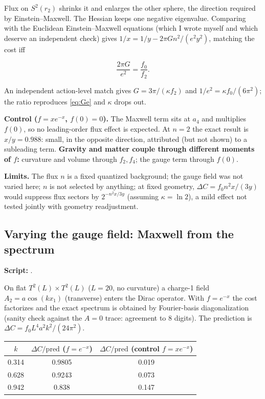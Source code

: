 \documentclass[11pt]{article}
\newcommand{\repo}{https://github.com/juhameskanen/abstract/blob/main/tests}
\newcommand{\testfile}[1]{\href{\repo/#1}{\texttt{\detokenize{#1}}}}
\begin{document}
Flux on $S^2(r_2)$ shrinks it and enlarges the other sphere, the direction required by Einstein--Maxwell.
The Hessian keeps one negative eigenvalue. Comparing with the Euclidean Einstein--Maxwell equations
(which I wrote myself and which deserve an independent check) gives
$1/x=1/y-2\pi G n^2/(e^2y^2)$, matching the cost iff

\begin{equation}
\frac{2\pi G}{e^2}=\frac{f_0}{f_2}.
\label{eq:Ge}
\end{equation}

An independent action-level match gives $G=3\pi/(\kappa f_2)$ and $1/e^2=\kappa f_0/(6\pi^2)$; the ratio
reproduces \eqref{eq:Ge} and $\kappa$ drops out.

\textbf{Control ($f=xe^{-x}$, $f(0)=0$).} The Maxwell term sits at $a_4$ and multiplies $f(0)$, so no leading-order
flux effect is expected. At $n=2$ the exact result is $x/y=0.988$: small, in the opposite direction, attributed (but not shown) to a
subleading term. \textbf{Gravity and matter couple through different moments of $f$:} curvature and volume through
$f_2,f_4$; the gauge term through $f(0)$.

\textbf{Limits.} The flux $n$ is a fixed quantized background; the gauge field was not varied here;
$n$ is not selected by anything; at fixed geometry, $\Delta C=f_0n^2x/(3y)$ would suppress flux
sectors by $2^{-n^2x/3y}$ (assuming $\kappa=\ln2$), a mild effect not tested jointly with geometry readjustment.


\subsection{Varying the gauge field: Maxwell from the spectrum}
\label{sec:maxwell}
\textbf{Script:} \testfile{maxwell_from_spectrum.py}.

On flat $T^2(L)\times T^2(L)$ ($L=20$, no curvature) a charge-1 field $A_2=a\cos(kx_1)$ (transverse) enters the Dirac operator.
With $f=e^{-x}$ the cost factorizes and the exact spectrum is obtained by Fourier-basis
diagonalization (sanity check against the $A=0$ trace: agreement to 8 digits). The prediction is
$\Delta C=f_0L^4a^2k^2/(24\pi^2)$.

\begin{center}
\small
\begin{tabular}{@{}ccc@{}}
\toprule
$k$ & $\Delta C/\mathrm{pred}$ ($f=e^{-x}$) & $\Delta C/\mathrm{pred}$ (control $f=xe^{-x}$)\\
\midrule
0.314 & 0.9805 & 0.019\\
0.628 & 0.9243 & 0.073\\
0.942 & 0.838 & 0.147\\
\bottomrule
\end{tabular}
\end{center}
\end{document}

